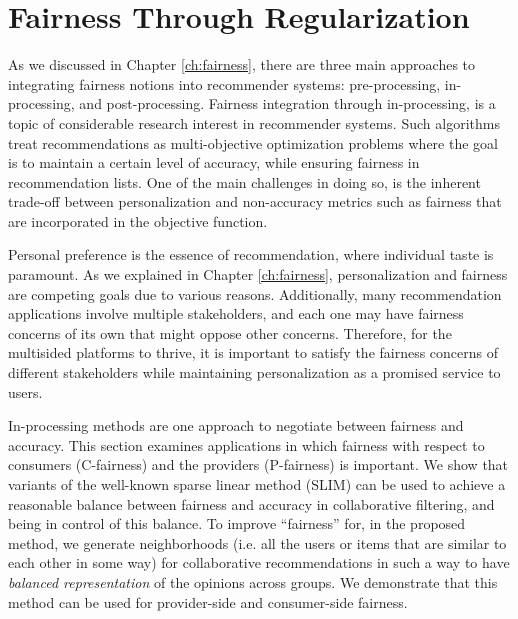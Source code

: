 \chapter{Fairness Through Regularization}
\label{ch:fairness_inproc}


As we discussed in Chapter \ref{ch:fairness}, there are three main approaches to integrating fairness notions into recommender systems: pre-processing, in-processing, and post-processing. Fairness integration through in-processing, is a topic of considerable research interest in recommender systems. Such algorithms treat recommendations as multi-objective optimization problems where the goal is to maintain a certain level of accuracy, while ensuring fairness in recommendation lists. One of the main challenges in doing so, is the inherent trade-off between personalization and non-accuracy metrics such as fairness that are incorporated in the objective function.

Personal preference is the essence of recommendation, where individual taste is paramount. As we explained in Chapter \ref{ch:fairness}, personalization and fairness are competing goals due to various reasons. Additionally, many recommendation applications involve multiple stakeholders, and each one may have fairness concerns of its own that might oppose other concerns. Therefore, for the multisided platforms to thrive, it is important to satisfy the fairness concerns of different stakeholders while maintaining personalization as a promised service to users.

In-processing methods are one approach to negotiate between fairness and accuracy. This section examines applications in which fairness with respect to consumers (C-fairness) and the providers (P-fairness) is important. We show that variants of the well-known sparse linear method (SLIM) can be used to achieve a reasonable balance between fairness and accuracy in collaborative filtering, and being in control of this balance. To improve ``fairness'' for, in the proposed method, we generate neighborhoods (i.e. all the users or items that are similar to each other in some way) for collaborative recommendations in such a way to have \textit{balanced representation} of the opinions across groups. We demonstrate that this method can be used for provider-side and consumer-side fairness.

